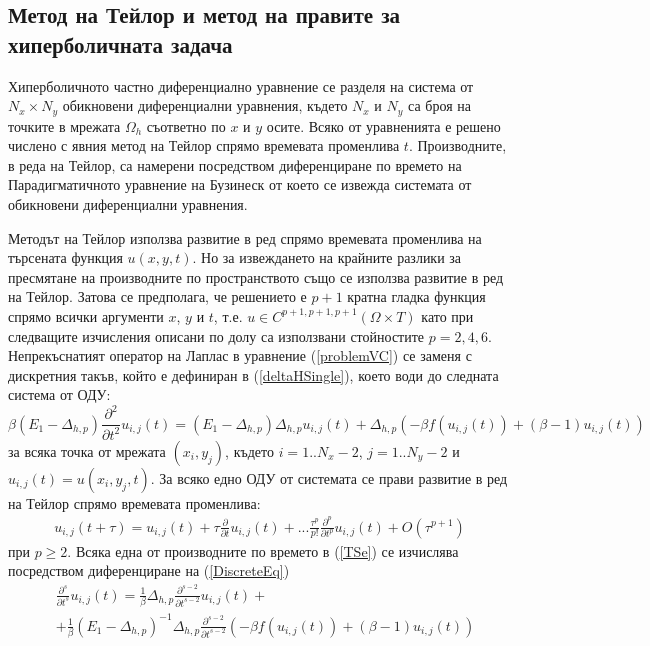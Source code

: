 \documentclass[a4paper]{article}
\newcommand{\be}{\begin{equation}}
\newcommand{\ee}{\end{equation}}
\newcommand{\rf}[1]{(\ref{#1})}
\theoremstyle{remark}
\begin{document}
\subsection{Метод на Тейлор и метод на правите за хиперболичната задача}
Хиперболичното частно диференциално уравнение се разделя на система от $N_x \times N_y$ обикновени диференциални уравнения, където $N_x$ и $N_y$ са броя на точките в мрежата $\Omega_h$ съответно по $x$ и $y$ осите. Всяко от уравненията е решено числено с явния метод на Тейлор спрямо времевата променлива $t$. Производните, в реда на Тейлор, са намерени посредством диференциране по времето на Парадигматичното уравнение на Бузинеск от което се извежда системата от обикновени диференциални уравнения.

Методът на Тейлор използва развитие в ред спрямо времевата променлива на търсената функция $u(x,y,t)$. Но за извеждането на крайните разлики за пресмятане на производните по пространството също се използва развитие в ред на Тейлор. Затова се предполага, че решението е $p+1$ кратна гладка функция спрямо всички аргументи $x$, $y$ и $t$, т.е. $u \in C^{p+1,p+1,p+1}(\Omega \times T)$ като при следващите изчисления описани по долу са използвани стойностите $p=2,4,6$. Непрекъснатият оператор на Лаплас в уравнение \rf{problemVC} се заменя с дискретния такъв, който е дефиниран в \rf{deltaHSingle}, което води до следната система от ОДУ:
\be \label{DiscreteEq}
\beta (E_1-\Delta_{h,p}) \frac{\partial^2 }{\partial t^2}u_{i, j}(t)=
 (E_1 - \Delta_{h,p})\Delta_{h,p} u_{i, j}(t) + \Delta_{h,p} ( -\beta f( u_{i, j}(t) ) + (\beta-1) u_{i, j}(t) )
\ee
за всяка точка от мрежата $(x_i, y_j)$, където $i = 1..N_x-2$, $j=1..N_y-2$ и $u_{i, j}(t) = u(x_i, y_j, t)$. За всяко едно ОДУ от системата се прави развитие в ред на Тейлор спрямо времевата променлива:
\begin{align} \label{TSe}
u_{i, j}(t+\tau) = u_{i, j}(t) + \tau \frac{ \partial }{ \partial t }u_{i, j}(t)  + ... 
\frac{ \tau^p }{ p! } \frac{ \partial^p}{ \partial t^p }u_{i, j}(t) + O(\tau^{p+1})
\end{align}
при $p \ge 2$. Всяка една от производните по времето в \rf{TSe} се изчислява посредством диференциране на \rf{DiscreteEq}
\begin{align}\label{discreteDer}
&\frac{\partial^s}{\partial t^s}u_{i, j}(t)= \frac{1}{\beta} \Delta_{h,p} \frac{\partial^{s-2}}{\partial t^{s-2}} u_{i, j}(t) + \nonumber \\ 
&+\frac{1}{\beta} (E_1-\Delta_{h,p})^{-1} \Delta_{h,p} \frac{\partial^{s-2}}{\partial t^{s-2}} ( -\beta f( u_{i, j}(t) ) + (\beta-1) u_{i, j}(t) ) 
\end{align}
\end{document}
